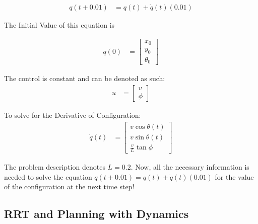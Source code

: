 \documentclass{article}
\begin{document}
\begin{align}
    q(t + 0.01) &= q(t) + \dot{q}(t) (0.01)
\end{align}

The Initial Value of this equation is 

\begin{align}
    q(0) &= \begin{bmatrix}
           x_0 \\
           y_0 \\
           \theta_0
         \end{bmatrix}
\end{align}

The control is constant and can be denoted as such: 
\begin{align}
    u &= \begin{bmatrix}
           v \\
           \phi
         \end{bmatrix}
\end{align}

To solve for the Derivative of Configuration: \newline 
\begin{align}
    \dot{q}(t) &= \begin{bmatrix}
           v\cos{\theta(t)} \\
           v\sin{\theta(t)} \\
           \frac{v}{L} \tan{\phi}
         \end{bmatrix}
\end{align}

The problem description denotes $L = 0.2$. Now, all the necessary information is needed to solve the equation $q(t + 0.01) = q(t) + \dot{q}(t) (0.01)$ for the value of the configuration at the next time step! 
\subsection{RRT and Planning with Dynamics}
\end{document}
